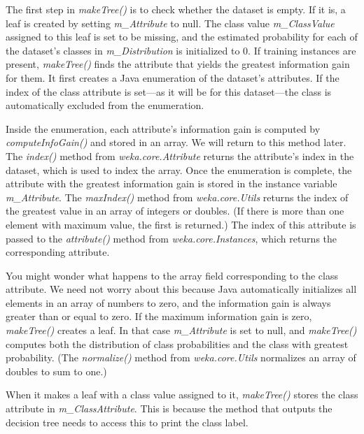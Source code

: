 The first step in \textit{makeTree()} is to check whether the dataset is
empty. If it is, a leaf is created by setting \textit{m\_Attribute} to null. The
class value \textit{m\_ClassValue} assigned to this leaf is set to be missing,
and the estimated probability for each of the dataset's classes in
\textit{m\_Distribution} is initialized to 0. If training instances are present,
\textit{makeTree()} finds the attribute that yields the greatest information
gain for them. It first creates a Java enumeration of the dataset's
attributes. If the index of the class attribute is set—as it will be
for this dataset---the class is automatically excluded from the
enumeration.

Inside the enumeration, each attribute's information gain is computed
by \textit{computeInfoGain()} and stored in an array. We will return
to this method later. The \textit{index()} method
from \textit{weka.core.Attribute} returns the attribute's index in the
dataset, which is used to index the array. Once the enumeration is
complete, the attribute with the greatest information gain is stored
in the instance variable \textit{m\_Attribute}. The \textit{maxIndex()} method from
\textit{weka.core.Utils} returns the index of the greatest value in an array of
integers or doubles. (If there is more than one element with maximum
value, the first is returned.) The index of this attribute is passed
to the \textit{attribute()} method from \textit{weka.core.Instances},
which returns the corresponding attribute.

You might wonder what happens to the array field corresponding to the
class attribute. We need not worry about this because Java
automatically initializes all elements in an array of numbers to zero,
and the information gain is always greater than or equal to zero. If
the maximum information gain is zero, \textit{makeTree()} creates a
leaf. In that case \textit{m\_Attribute} is set to null,
and \textit{makeTree()} computes both the distribution of class
probabilities and the class with greatest probability. (The
\textit{normalize()} method from \textit{weka.core.Utils} normalizes 
an array of doubles to sum to one.)

When it makes a leaf with a class value assigned to
it, \textit{makeTree()} stores the class attribute
in \textit{m\_ClassAttribute}. This is because the method that outputs
the decision tree needs to access this to print the class label.

